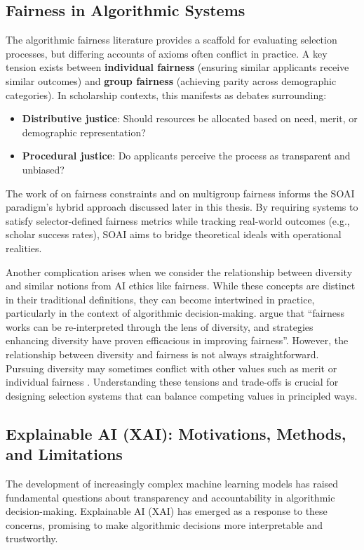 \subsection{Fairness in Algorithmic Systems}\label{ssec:context_fairness}
The algorithmic fairness literature provides a scaffold for evaluating selection processes, but differing accounts of axioms often conflict in practice. A key tension exists between \textbf{individual fairness} (ensuring similar applicants receive similar outcomes) and \textbf{group fairness} (achieving parity across demographic categories). In scholarship contexts, this manifests as debates surrounding:
\begin{itemize}
    \item \textbf{Distributive justice}: Should resources be allocated based on need, merit, or demographic representation?
    \item \textbf{Procedural justice}: Do applicants perceive the process as transparent and unbiased?
\end{itemize}
The work of \textcite{dwork_fairness_2012} on fairness constraints and \textcite{pmlr-v80-kearns18a} on multigroup fairness informs the SOAI paradigm's hybrid approach discussed later in this thesis. By requiring systems to satisfy selector-defined fairness metrics while tracking real-world outcomes (e.g., scholar success rates), SOAI aims to bridge theoretical ideals with operational realities.

Another complication arises when we consider the relationship between diversity and similar notions from AI ethics like fairness. While these concepts are distinct in their traditional definitions, they can become intertwined in practice, particularly in the context of algorithmic decision-making. \textcite{zhao2023fairness} argue that ``fairness works can be re-interpreted through the lens of diversity, and strategies enhancing diversity have proven efficacious in improving fairness''. However, the relationship between diversity and fairness is not always straightforward. Pursuing diversity may sometimes conflict with other values such as merit or individual fairness \cite{dwork_fairness_2012}. Understanding these tensions and trade-offs is crucial for designing selection systems that can balance competing values in principled ways.

\subsection{Explainable AI (XAI): Motivations, Methods, and Limitations}\label{ssec:context_xai}
The development of increasingly complex machine learning models has raised fundamental questions about transparency and accountability in algorithmic decision-making. Explainable AI (XAI) has emerged as a response to these concerns, promising to make algorithmic decisions more interpretable and trustworthy.

